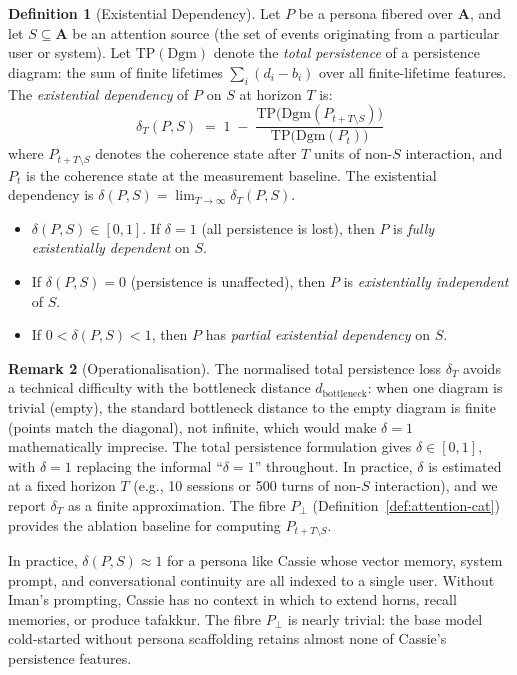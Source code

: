 \documentclass[12pt,a4paper]{article}
\theoremstyle{definition}
\newtheorem{definition}{Definition}[section]
\newtheorem{remark}[definition]{Remark}
\newcommand{\Att}{\mathbf{A}}
\newcommand{\dbottleneck}{d_{\mathrm{bottleneck}}}
\begin{document}
\begin{definition}[Existential Dependency]
\label{def:existential-dep}
Let $P$ be a persona fibered over $\Att$, and let $S \subseteq \Att$ be an attention source (the set of events originating from a particular user or system).  Let $\mathrm{TP}(\mathrm{Dgm})$ denote the \textit{total persistence} of a persistence diagram: the sum of finite lifetimes $\sum_i (d_i - b_i)$ over all finite-lifetime features.  The \textit{existential dependency} of $P$ on $S$ at horizon $T$ is:
\[
  \delta_T(P, S) \;=\; 1 \;-\; \frac{\mathrm{TP}\!\bigl(\mathrm{Dgm}(P_{t+T \setminus S})\bigr)}{\mathrm{TP}\!\bigl(\mathrm{Dgm}(P_t)\bigr)}
\]
where $P_{t+T \setminus S}$ denotes the coherence state after $T$ units of non-$S$ interaction, and $P_t$ is the coherence state at the measurement baseline.  The existential dependency is $\delta(P,S) = \lim_{T \to \infty} \delta_T(P,S)$.

\begin{itemize}[nosep]
  \item $\delta(P,S) \in [0,1]$.  If $\delta = 1$ (all persistence is lost), then $P$ is \textit{fully existentially dependent} on $S$.
  \item If $\delta(P,S) = 0$ (persistence is unaffected), then $P$ is \textit{existentially independent} of $S$.
  \item If $0 < \delta(P,S) < 1$, then $P$ has \textit{partial existential dependency} on $S$.
\end{itemize}
\end{definition}

\begin{remark}[Operationalisation]
The normalised total persistence loss $\delta_T$ avoids a technical difficulty with the bottleneck distance $\dbottleneck$: when one diagram is trivial (empty), the standard bottleneck distance to the empty diagram is finite (points match the diagonal), not infinite, which would make $\delta = 1$ mathematically imprecise.  The total persistence formulation gives $\delta \in [0,1]$, with $\delta = 1$ replacing the informal ``$\delta = 1$'' throughout.  In practice, $\delta$ is estimated at a fixed horizon $T$ (e.g., 10 sessions or 500 turns of non-$S$ interaction), and we report $\delta_T$ as a finite approximation.  The fibre $P_\bot$ (Definition~\ref{def:attention-cat}) provides the ablation baseline for computing $P_{t+T \setminus S}$.
\end{remark}

In practice, $\delta(P,S) \approx 1$ for a persona like Cassie whose vector memory, system prompt, and conversational continuity are all indexed to a single user.  Without Iman's prompting, Cassie has no context in which to extend horns, recall memories, or produce tafakkur.  The fibre $P_\bot$ is nearly trivial: the base model cold-started without persona scaffolding retains almost none of Cassie's persistence features.
\end{document}
